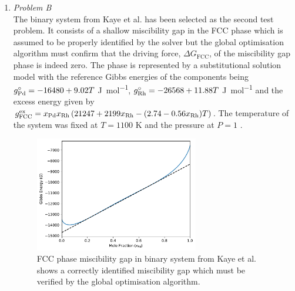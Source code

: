 \begin{enumerate}
	
	\item	\emph{Problem B}\\
		The binary   system from Kaye et al. \cite{Kaye07} has been selected as the second test problem. It consists of a shallow miscibility gap in the FCC phase which is assumed to be properly identified by the solver but the global optimisation algorithm must confirm that the driving force, $\Delta G_\text{FCC}$, of the miscibility gap phase is indeed zero. The phase is represented by a substitutional solution model with the reference Gibbs energies of the components being $g_{\ce{Pd}}^\circ = -16480 + 9.02T$ \si{\joule \per \mole}, $g_{\ce{Rh}}^\circ = -26568 + 11.88 T$ \si{\joule \per \mole} and the excess energy given by $g_\text{FCC}^\text{ex} = x_{\ce{Pd}}x_{\ce{Rh}} \left(21247 + 2199 x_{\ce{Rh}} - (2.74 - 0.56x_{\ce{Rh}})T\right)$. The temperature of the system was fixed at $T = 1100$ \si{\kelvin} and the pressure at $P=1$ \si{\atmosphere}.
		\begin{figure}[htbp]			
			\centering
			\includegraphics[width=0.675\textwidth]{figures/chapter-6/System_PdRh.pdf}
			\caption[Global optimisation test problem B: FCC phase miscibility gap in  binary system.]{FCC phase miscibility gap in  binary system from Kaye et al. \cite{Kaye07} shows a correctly identified miscibility gap which must be verified by the global optimisation algorithm.}
			\label{fig:testB}
		\end{figure}


\end{enumerate}
